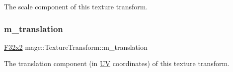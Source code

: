 The scale component of this texture transform. \mbox{\label{classmage_1_1_texture_transform_a1a8adc206e6b6f7e3ec255fc82e73524}} 
\subsubsection{\texorpdfstring{m\+\_\+translation}{m\_translation}}
{\footnotesize\ttfamily \mbox{\hyperlink{namespacemage_aee4759dedc8def6c6dec26b5c7eddf29}{F32x2}} mage\+::\+Texture\+Transform\+::m\+\_\+translation\hspace{0.3cm}{\ttfamily [private]}}

The translation component (in \mbox{\hyperlink{structmage_1_1_u_v}{UV}} coordinates) of this texture transform. 